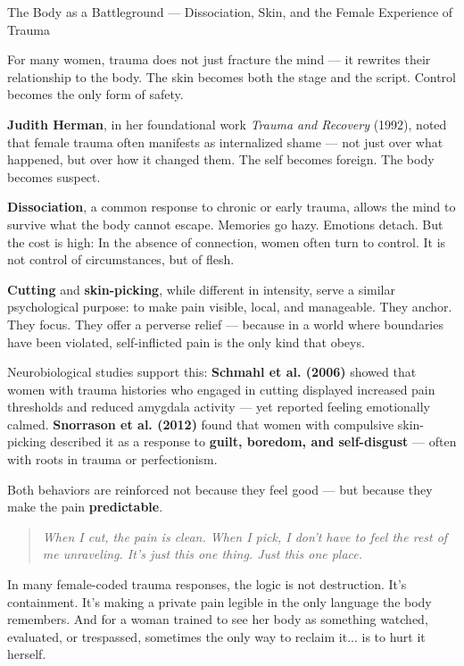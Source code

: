 \begin{PsychologicalSidebar}{The Body as a Battleground --- 
  Dissociation, Skin, and the Female Experience of Trauma}
  
  For many women, trauma does not just fracture the mind —  
  it rewrites their relationship to the body.  
  The skin becomes both the stage and the script.  
  Control becomes the only form of safety.
  
  \medskip
  
  \textbf{Judith Herman}, in her foundational work \textit{Trauma and Recovery} (1992), 
  noted that female trauma often manifests as internalized shame — 
  not just over what happened, but over how it changed them.  
  The self becomes foreign.  
  The body becomes suspect.
  
  \medskip
  
  \textbf{Dissociation}, a common response to chronic or early trauma, 
  allows the mind to survive what the body cannot escape.  
  Memories go hazy. Emotions detach.  
  But the cost is high:  
  In the absence of connection, women often turn to control.
  It is not control of circumstances, but of flesh.
  
  \medskip
  
  \textbf{Cutting} and \textbf{skin-picking}, while different in intensity,  
  serve a similar psychological purpose:  
  to make pain visible, local, and manageable.  
  They anchor. They focus.  
  They offer a perverse relief —  
  because in a world where boundaries have been violated,  
  self-inflicted pain is the only kind that obeys.
  
  \medskip
  
  Neurobiological studies support this:  
  \textbf{Schmahl et al. (2006)} showed that women with trauma histories 
  who engaged in cutting displayed increased pain thresholds and reduced 
  amygdala activity — yet reported feeling emotionally calmed.  
  \textbf{Snorrason et al. (2012)} found that women with compulsive 
  skin-picking described it as a response to \textbf{guilt, boredom, and self-disgust} 
  ---  
  often with roots in trauma or perfectionism.
  
  \medskip
  
  Both behaviors are reinforced not because they feel good —  
  but because they make the pain \textbf{predictable}.
  
  \begin{quote}
  \itshape
  When I cut, the pain is clean.  
  When I pick, I don’t have to feel the rest of me unraveling.  
  It’s just this one thing. Just this one place.
  \end{quote}
  
  \medskip
  
  In many female-coded trauma responses, the logic is not destruction.  
  It’s containment.  
  It’s making a private pain legible in the only language the body remembers.  
  And for a woman trained to see her body as something watched, evaluated, or trespassed,  
  sometimes the only way to reclaim it... is to hurt it herself.
  
\end{PsychologicalSidebar}
  

